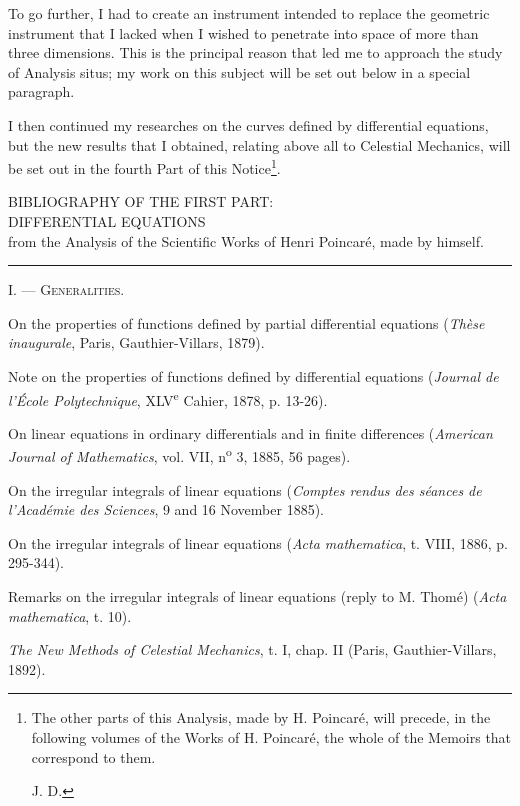\documentclass[11pt]{article}
\newcommand{\shortline}{\begin{center}\rule{3.5em}{0.4pt}\end{center}}
\begin{document}
To go further, I had to create an instrument intended to replace the geometric instrument that I lacked when I wished to penetrate into space of more than three dimensions. This is the principal reason that led me to approach the study of Analysis situs; my work on this subject will be set out below in a special paragraph.

I then continued my researches on the curves defined by differential equations, but the new results that I obtained, relating above all to Celestial Mechanics, will be set out in the fourth Part of this Notice\footnote[1]{The other parts of this Analysis, made by H. Poincaré, will precede, in the following volumes of the Works of H. Poincaré, the whole of the Memoirs that correspond to them.\par\hfill J. D.}.



\clearpage
\begin{center}
{\large BIBLIOGRAPHY OF THE FIRST PART:}\\[1em]
{\Large DIFFERENTIAL EQUATIONS}\\[1em]
{from the Analysis of the Scientific Works of Henri Poincaré, made by himself.}
\end{center}
\shortline

\begin{center}
{\scshape I. — Generalities.}
\end{center}

\begin{description}[leftmargin=3.4em,labelwidth=2.8em,style=nextline]
\item[64.] On the properties of functions defined by partial differential equations (\emph{Thèse inaugurale}, Paris, Gauthier-Villars, 1879).
\item[78.] Note on the properties of functions defined by differential equations (\emph{Journal de l’École Polytechnique}, XLV\textsuperscript{e} Cahier, 1878, p. 13-26).
\item[83.] On linear equations in ordinary differentials and in finite differences (\emph{American Journal of Mathematics}, vol. VII, n\textsuperscript{o} 3, 1885, 56 pages).
\item[57.] On the irregular integrals of linear equations (\emph{Comptes rendus des séances de l’Académie des Sciences}, 9 and 16 November 1885).
\item[73.] On the irregular integrals of linear equations (\emph{Acta mathematica}, t. VIII, 1886, p. 295-344).
\item[182.] Remarks on the irregular integrals of linear equations (reply to M. Thomé) (\emph{Acta mathematica}, t. 10).
\item[278.] \emph{The New Methods of Celestial Mechanics}, t. I, chap. II (Paris, Gauthier-Villars, 1892).
\end{description}
\end{document}
